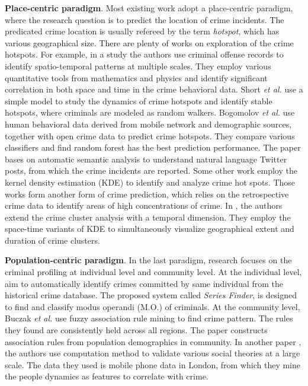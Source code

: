 \textbf{Place-centric paradigm}. Most existing work adopt a place-centric paradigm, where the research question is to predict the location of  crime incidents.  The predicated crime location is usually refereed by the term \emph{hotspot}, which has various geographical size.  There are plenty of works on exploration of the crime hotspots. For example, in a study \cite{TEP11} the authors  use criminal offense records to identify spatio-temporal patterns at multiple scales. They employ various quantitative tools from mathematics and physics and identify significant correlation in both space and time in the crime behavioral data.  Short \emph{et al.} \cite{SDPT+08} use a simple model to study the dynamics of crime hotspots and identify stable hotspots, where criminals are modeled as random walkers.  Bogomolov \emph{et al.} \cite{Bogo14} use human behavioral data derived from mobile network and demographic sources, together with open crime data to predict crime hotspots. They compare various classifiers and find random forest has the best prediction performance. The paper \cite{WGB12} bases on automatic semantic analysis to understand natural language Twitter posts, from which the crime incidents are reported. Some other work \cite{CTU08,ECCW05} employ the kernel density estimation (KDE) to identify and analyze crime hot spots. Those works form another form of crime prediction, which relies on the retrospective crime data to identify areas of high concentrations of crime. In  \cite{NaYa14}, the authors extend the crime cluster analysis with a temporal dimension. They employ the space-time variants of KDE to simultaneously visualize geographical extent and duration of crime clusters. 




\textbf{Population-centric paradigm}. In the last paradigm, research focuses on the criminal profiling at individual level and community level. At the individual level, \cite{WRWS13} aim to automatically  identify crimes committed by same individual from the historical crime database. The proposed system called \emph{Series Finder}, is designed to find and classify modus operandi (M.O.)  of criminals.  At the community level, Buczak \emph{et al.} \cite{BuGi10} use fuzzy association rule mining to find crime pattern. The rules they found are consistently held across all regions. The paper constructs association rules from population demographics in community.  In another paper \cite{TQC14}, the authors use computation method to validate various social theories at a large scale.  The data they used is mobile phone data in London, from which they mine the  people dynamics as features to correlate with crime.  


